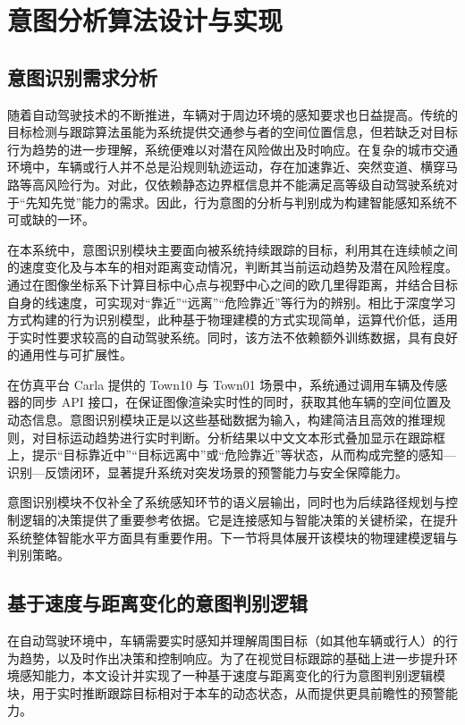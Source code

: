 \chapter{意图分析算法设计与实现}

\section{意图识别需求分析}

随着自动驾驶技术的不断推进，车辆对于周边环境的感知要求也日益提高。传统的目标检测与跟踪算法虽能为系统提供交通参与者的空间位置信息，但若缺乏对目标行为趋势的进一步理解，系统便难以对潜在风险做出及时响应。在复杂的城市交通环境中，车辆或行人并不总是沿规则轨迹运动，存在加速靠近、突然变道、横穿马路等高风险行为。对此，仅依赖静态边界框信息并不能满足高等级自动驾驶系统对于“先知先觉”能力的需求。因此，行为意图的分析与判别成为构建智能感知系统不可或缺的一环。

在本系统中，意图识别模块主要面向被系统持续跟踪的目标，利用其在连续帧之间的速度变化及与本车的相对距离变动情况，判断其当前运动趋势及潜在风险程度。通过在图像坐标系下计算目标中心点与视野中心之间的欧几里得距离，并结合目标自身的线速度，可实现对“靠近”“远离”“危险靠近”等行为的辨别。相比于深度学习方式构建的行为识别模型，此种基于物理建模的方式实现简单，运算代价低，适用于实时性要求较高的自动驾驶系统。同时，该方法不依赖额外训练数据，具有良好的通用性与可扩展性。

在仿真平台 Carla 提供的 Town10 与 Town01 场景中，系统通过调用车辆及传感器的同步 API 接口，在保证图像渲染实时性的同时，获取其他车辆的空间位置及动态信息。意图识别模块正是以这些基础数据为输入，构建简洁且高效的推理规则，对目标运动趋势进行实时判断。分析结果以中文文本形式叠加显示在跟踪框上，提示“目标靠近中”“目标远离中”或“危险靠近”等状态，从而构成完整的感知—识别—反馈闭环，显著提升系统对突发场景的预警能力与安全保障能力。

意图识别模块不仅补全了系统感知环节的语义层输出，同时也为后续路径规划与控制逻辑的决策提供了重要参考依据。它是连接感知与智能决策的关键桥梁，在提升系统整体智能水平方面具有重要作用。下一节将具体展开该模块的物理建模逻辑与判别策略。

\section{基于速度与距离变化的意图判别逻辑}

在自动驾驶环境中，车辆需要实时感知并理解周围目标（如其他车辆或行人）的行为趋势，以及时作出决策和控制响应。为了在视觉目标跟踪的基础上进一步提升环境感知能力，本文设计并实现了一种基于速度与距离变化的行为意图判别逻辑模块，用于实时推断跟踪目标相对于本车的动态状态，从而提供更具前瞻性的预警能力。

